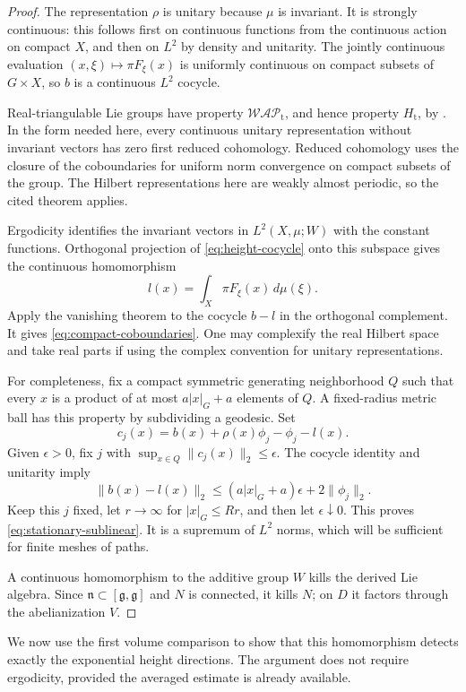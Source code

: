 \begin{proof}
The representation $\rho$ is unitary because $\mu$ is invariant.
It is strongly continuous: this follows first on continuous functions
from the continuous action on compact $X$, and then on $L^2$ by
density and unitarity.  The jointly continuous evaluation
$(x,\xi)\mapsto\pi F_\xi(x)$ is uniformly continuous on compact
subsets of $G\times X$, so $b$ is a continuous $L^2$ cocycle.

Real-triangulable Lie groups have property $\mathcal{WAP}_{\mathrm t}$,
and hence property $H_{\mathrm t}$, by
\cite[Corollary~1.9]{CornulierTessera2020}.  In the form needed here,
every continuous unitary representation without invariant vectors has
zero first reduced cohomology.  Reduced cohomology uses the closure
of the coboundaries for uniform norm convergence on compact subsets
of the group.  The Hilbert representations here are weakly almost
periodic, so the cited theorem applies.

Ergodicity identifies the invariant vectors in $L^2(X,\mu;W)$ with
the constant functions.  Orthogonal projection of
\eqref{eq:height-cocycle} onto this subspace gives the continuous
homomorphism
\[
 l(x)=\int_X\pi F_\xi(x)\,d\mu(\xi).
\]
Apply the vanishing theorem to the cocycle $b-l$ in the orthogonal
complement.  It gives \eqref{eq:compact-coboundaries}.  One may
complexify the real Hilbert space and take real parts if using the
complex convention for unitary representations.

For completeness, fix a compact symmetric generating neighborhood
$Q$ such that every $x$ is a product of at most $a|x|_G+a$ elements
of $Q$.  A fixed-radius metric ball has this property by subdividing
a geodesic.  Set
\[
 c_j(x)=b(x)+\rho(x)\phi_j-\phi_j-l(x).
\]
Given $\epsilon>0$, fix $j$ with
$\sup_{x\in Q}\|c_j(x)\|_2\le\epsilon$.
The cocycle identity and unitarity imply
\[
 \|b(x)-l(x)\|_2
 \le (a|x|_G+a)\epsilon+2\|\phi_j\|_2.
\]
Keep this $j$ fixed, let $r\to\infty$ for $|x|_G\le Rr$, and then
let $\epsilon\downarrow0$.  This proves
\eqref{eq:stationary-sublinear}.  It is a supremum of $L^2$ norms,
which will be sufficient for finite meshes of paths.

A continuous homomorphism to the additive group $W$ kills the
derived Lie algebra.  Since $\mathfrak n\subset[\mathfrak g,\mathfrak g]$
and $N$ is connected, it kills $N$; on $D$ it factors through the
abelianization $V$.
\end{proof}

We now use the first volume comparison to show that this homomorphism
detects exactly the exponential height directions.  The argument does
not require ergodicity, provided the averaged estimate is already
available.

